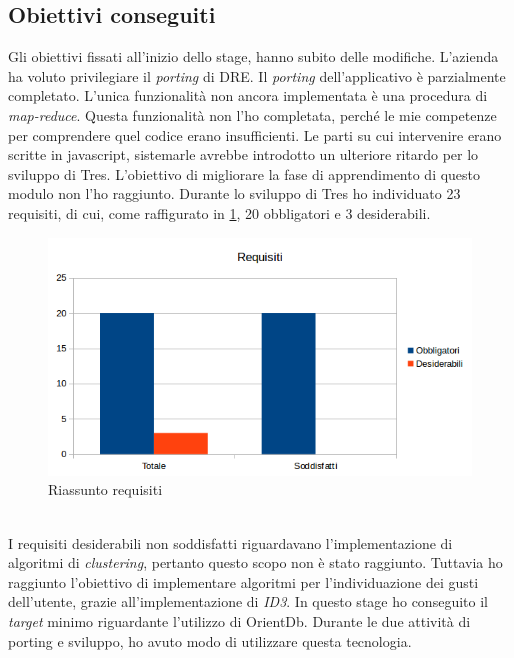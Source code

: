 \subsection{Obiettivi conseguiti}
Gli obiettivi fissati all'inizio dello stage, hanno subito delle modifiche. L'azienda ha voluto privilegiare il \emph{porting} di DRE. Il \emph{porting} dell'applicativo è parzialmente completato. L'unica funzionalità non ancora implementata è una procedura di \emph{map-reduce}. Questa funzionalità non l'ho completata, perché le mie competenze per comprendere quel codice erano insufficienti. Le parti su cui intervenire erano scritte in javascript, sistemarle avrebbe introdotto un ulteriore ritardo per lo sviluppo di Tres. L'obiettivo di migliorare la fase di apprendimento di questo modulo non l'ho raggiunto. Durante lo sviluppo di Tres ho individuato 23 requisiti, di cui, come raffigurato in \ref{fig:graficorequisiti}, 20 obbligatori e 3 desiderabili.  
\begin{figure}[h]
\centering
\includegraphics[scale=0.64]{immagini/graficorequisiti}
\caption{Riassunto requisiti}
\label{fig:graficorequisiti}
\end{figure}
\\I requisiti desiderabili non soddisfatti riguardavano l'implementazione di algoritmi di \emph{clustering}, pertanto questo scopo non è stato raggiunto.
Tuttavia ho raggiunto l'obiettivo di implementare algoritmi per l'individuazione dei gusti dell'utente, grazie all'implementazione di \emph{ID3}. In questo stage ho conseguito il \emph{target} minimo riguardante l'utilizzo di OrientDb. Durante le due attività di porting e sviluppo, ho avuto modo di utilizzare questa tecnologia. 
